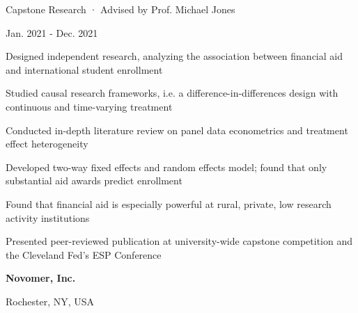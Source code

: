 \documentclass[a4paper,20pt]{article}
\begin{document}
    \begin{minipage}{.75\linewidth} \begin{flushleft}
    		Capstone Research · Advised by Prof. Michael Jones
    	\end{flushleft} \end{minipage}
    \hfill 
    \begin{minipage}{.20\linewidth}\begin{flushright}
    	 Jan. 2021 - Dec. 2021
    	\end{flushright}\end{minipage}
        \vspace{-5pt}
	\begin{description}[font=$\bullet$]
	\item{Designed independent research, analyzing the association between financial aid and international student enrollment}
        \vspace{-7pt}
        \item{Studied causal research frameworks, i.e. a difference-in-differences design with continuous and time-varying treatment}
        \vspace{-7pt}
        \item{Conducted in-depth literature review on panel data econometrics and treatment effect heterogeneity } 
        \vspace{-7pt}
        \item{Developed two-way fixed effects and random effects model; found that only substantial aid awards predict enrollment}
        \vspace{-7pt}
        \item{Found that financial aid is especially powerful at rural, private, low research activity institutions}
        \vspace{-7pt}
        \item{Presented peer-reviewed publication at university-wide capstone competition and the Cleveland Fed’s ESP Conference}
	\end{description}

    \begin{minipage}{.75\linewidth} \begin{flushleft}
    		\textbf{Novomer, Inc.}
    	\end{flushleft} \end{minipage}
    \hfill 
    \begin{minipage}{.20\linewidth}\begin{flushright}
    	 Rochester, NY, USA
    	\end{flushright}\end{minipage}
     
\end{document}
